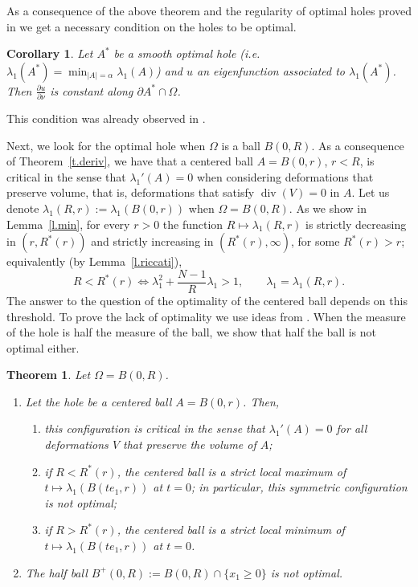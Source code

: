 \documentclass[11pt]{amsart}
\newtheorem{theorem}{Theorem}
\newtheorem{corollary}[lemma]{Corollary}
\theoremstyle{remark}
\numberwithin{equation}{section}
\DeclareMathOperator{\divg}{div}
\begin{document}
As a consequence of the above theorem and the regularity of optimal holes proved in \cite{FBRW2} we get a necessary condition on the holes to be optimal.

\begin{corollary}\label{c.opt}
Let $A^*$ be a smooth optimal hole (i.e. $\lambda_1(A^*)=\min_{|A|=\alpha}\lambda_1(A)$) and $u$ an eigenfunction associated to $\lambda_1(A^*)$. Then $\frac{\partial u}{\partial\nu}$ is constant along $\partial A^*\cap\Omega$.
\end{corollary}

This condition was already observed in \cite{FBRW2}.

Next, we look for the optimal hole when $\Omega$ is a ball $B(0,R)$. As a consequence of Theorem~\ref{t.deriv}, we have that a centered ball $A=B(0,r)$, $r<R$, is critical in the sense that $\lambda_1'(A)=0$ when considering deformations that preserve volume, that is, deformations that satisfy $\divg(V)=0$ in $A$. Let us denote $\lambda_1(R,r):=\lambda_1(B(0,r))$ when $\Omega=B(0,R)$. As we show in Lemma~\ref{l.min}, for every $r>0$ the function $R\mapsto\lambda_1(R,r)$ is strictly decreasing in $(r,R^*(r))$ and strictly increasing in $(R^*(r),\infty)$, for some $R^*(r)>r$; equivalently (by Lemma~\ref{l.riccati}),
\[
R<R^*(r)\iff\lambda_1^2+\frac{N-1}{R}\lambda_1>1,\qquad\lambda_1=\lambda_1(R,r).
\]
The answer to the question of the optimality of the centered ball depends on this threshold. To prove the lack of optimality we use ideas from \cite{LDT}. When the measure of the hole is half the measure of the ball, we show that half the ball is not optimal either.

\begin{theorem}\label{t.ball}
Let $\Omega=B(0,R)$.
\begin{enumerate}
\item Let the hole be a centered ball $A=B(0,r)$. Then,
\begin{enumerate}
\item this configuration is critical in the sense that $\lambda_1'(A)=0$ for all deformations $V$ that preserve the volume of $A$;
\item if $R<R^*(r)$, the centered ball is a strict local maximum of $t\mapsto\lambda_1(B(te_1,r))$ at $t=0$; in particular, this symmetric configuration is not optimal;
\item if $R>R^*(r)$, the centered ball is a strict local minimum of $t\mapsto\lambda_1(B(te_1,r))$ at $t=0$.
\end{enumerate}
\item The half ball $B^+(0,R):=B(0,R)\cap\{x_1\ge0\}$ is not optimal.
\end{enumerate}
\end{theorem}
\end{document}
